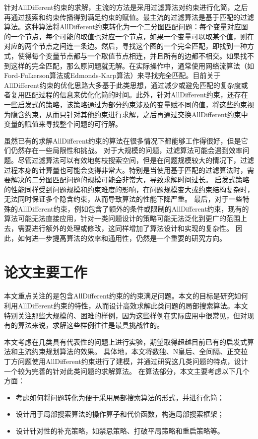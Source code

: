 针对AllDifferent约束的求解，主流的方法是采用过滤算法对约束进行化简，之后再通过搜索和约束传播得到满足约束的赋值。最主流的过滤算法是基于匹配的过滤算法\cite{regin1994filtering}。这种算法将AllDifferent约束转化为一个二分图匹配问题：每个变量对应图的一个节点，每个可能的取值也对应一个节点，如果一个变量可以取某个值，则在对应的两个节点之间连一条边。然后，寻找这个图的一个完全匹配，即找到一种方式，使得每个变量节点都与一个取值节点相连，并且所有的边都不相交。如果找不到这样的完全匹配，那么原问题就无解。在实际操作中，通常使用网络流算法（如Ford-Fulkerson算法\cite{ford1957simple}或Edmonds-Karp算法\cite{edmonds1972theoretical}）来寻找完全匹配。目前关于AllDifferent约束的优化思路大多基于此类思想，通过减少或避免匹配的复杂度或者复用匹配过程的信息来优化化简的时间。此外，针对AllDifferent约束，还存在一些启发式的策略\cite{michel2002constraint}，该策略通过为部分约束涉及的变量赋不同的值，将这些约束视为隐含约束，从而只针对其他约束进行求解，之后再通过交换AllDifferent约束中变量的赋值来寻找整个问题的可行解。

虽然已有的求解AllDifferent约束的算法在很多情况下都能够工作得很好，但是它们仍然存在一些局限性和挑战。
对于大规模的问题，过滤算法可能会遇到效率问题。尽管过滤算法可以有效地剪枝搜索空间，但是在问题规模较大的情况下，过滤过程本身的计算量也可能会变得非常大。特别是当使用基于匹配的过滤算法时，需要解决的二分图匹配问题的规模可能会非常大，导致求解时间过长。
启发式策略的性能同样受到问题规模和约束难度的影响，在问题规模变大或约束结构复杂时，无法同时保证多个隐含约束，从而导致算法的性能下降严重。
最后，对于一些特殊的AllDifferent约束，例如包含了额外的条件或限制的AllDifferent约束，现有的算法可能无法直接应用，针对一类问题设计的策略可能无法泛化到更广的范围上去，需要进行额外的处理或修改，这同样增加了算法设计和实现的复杂性。
因此，如何进一步提高算法的效率和通用性，仍然是一个重要的研究方向。

\section{论文主要工作}

本文重点关注的是包含AllDifferent约束的约束满足问题。本文的目标是研究如何利用AllDifferent约束的特性，从而设计高效求解此类问题的局部搜索算法。本文特别关注那些大规模的、困难的样例，因为这些样例在实际应用中很常见，但对现有的算法来说，求解这些样例往往是最具挑战性的。

本文考虑在几类具有代表性的问题上进行实验，期望取得超越目前已有的启发式算法和主流约束规划算法的效果。
具体地，本文将数独\cite{simonis2005sudoku}、N皇后\cite{rivin1994n}、全间隔\cite{morris1974structure}、正交拉丁方问题\cite{mann1942construction}使用AllDifferent约束进行了建模，并通过研究这几类问题的特点，设计一个较为完善的针对此类问题的求解算法。
在算法部分，本文主要考虑以下几个方面：
\begin{itemize}
    \item 考虑如何将问题转化为便于采用局部搜索算法的形式，并进行化简；
    \item 设计用于局部搜索算法的操作算子和代价函数，构造局部搜索框架；
    \item 设计针对性的补充策略，如禁忌策略、打破平局策略和重启策略等。
\end{itemize}

